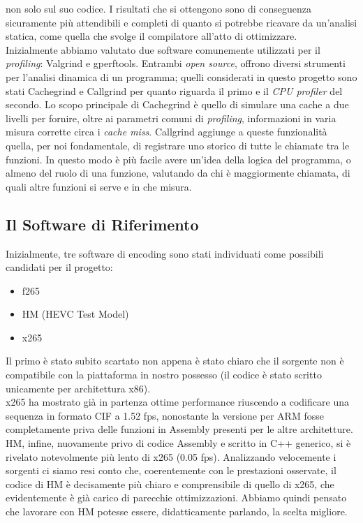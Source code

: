 non solo sul suo codice. I risultati che si ottengono sono di conseguenza 
sicuramente più attendibili e completi di quanto si potrebbe ricavare da 
un'analisi statica, come quella che svolge il compilatore all'atto di 
ottimizzare.\\
Inizialmente abbiamo valutato due software comunemente utilizzati per 
il \emph{profiling}: Valgrind e gperftools.
Entrambi \emph{open source}, offrono diversi strumenti per l'analisi dinamica 
di un programma; quelli considerati in questo progetto sono stati Cachegrind e 
Callgrind per quanto riguarda il primo e il \emph{CPU profiler} del secondo. 
Lo scopo principale di Cachegrind è quello di simulare una cache a due livelli 
per fornire, oltre ai parametri comuni di \emph{profiling}, informazioni in 
varia misura corrette circa 
i \emph{cache miss}. Callgrind aggiunge a queste funzionalità quella, per noi 
fondamentale, di registrare uno storico di tutte le chiamate tra le funzioni. 
In questo modo è più facile avere un'idea della logica del programma, o almeno 
del ruolo di una funzione, valutando da chi è maggiormente chiamata, di quali 
altre funzioni si serve e in che misura.
\subsection{Il Software di Riferimento}
Inizialmente, tre software di encoding sono stati individuati come possibili
candidati per il progetto:
\begin{itemize}
	\item f265
	\item HM (HEVC Test Model)
	\item x265
\end{itemize}
Il primo è stato subito scartato non appena è stato chiaro che il sorgente non 
è compatibile con la piattaforma in nostro possesso (il codice è stato scritto 
unicamente per architettura x86).\\
x265 ha mostrato già in partenza ottime performance riuscendo a 
codificare una sequenza in formato CIF a 1.52 fps, nonostante la versione per 
ARM fosse completamente priva delle funzioni in Assembly presenti per le altre 
architetture.\\
HM, infine, nuovamente privo di codice Assembly e scritto in C++ generico, si è 
rivelato notevolmente più lento di x265 (0.05 fps). Analizzando velocemente i 
sorgenti 
ci siamo resi conto che, coerentemente con le prestazioni osservate, il codice 
di HM è decisamente più chiaro e comprensibile di quello di x265, che 
evidentemente è già carico di parecchie ottimizzazioni. Abbiamo quindi pensato 
che 
lavorare con HM potesse essere, didatticamente parlando, la scelta migliore.
